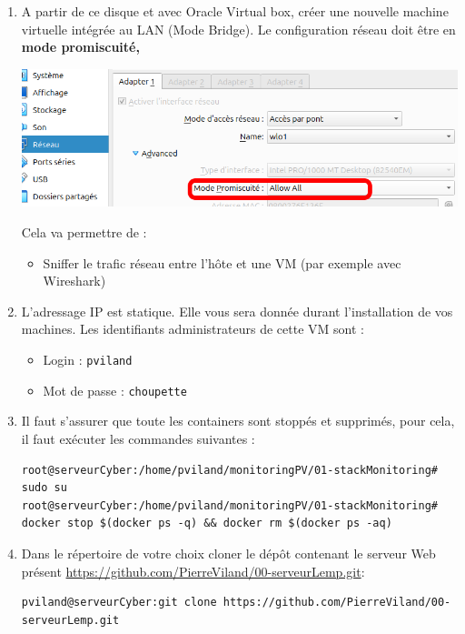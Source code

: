 \documentclass[french, 12pt]{article}%
\newcommand{\itemE}{\item[$\bullet$]}
\begin{document}
\begin{enumerate}
\item A partir de ce disque et avec Oracle Virtual box, créer une nouvelle machine virtuelle intégrée au LAN (Mode Bridge). Le configuration réseau doit être en \textbf{mode promiscuité,}

\begin{center}
\includegraphics[scale=0.4]{./ressource/modeProm.png}
\end{center}
Cela va permettre de : 
	\begin{itemize}
	\itemE Sniffer le trafic réseau entre l'hôte et une VM (par exemple avec Wireshark)
	\end{itemize}

\item L'adressage IP est statique. Elle vous sera donnée durant l'installation de vos machines. Les identifiants administrateurs de cette VM sont : 
	\begin{itemize}
	\itemE Login : \verb?pviland?
	\itemE Mot de passe : \verb?choupette?
	\end{itemize}

\item Il faut s'assurer que toute les containers sont stoppés et supprimés,  pour cela, il faut exécuter les commandes suivantes  : 
\begin{lstlisting}[style=commande]
root@serveurCyber:/home/pviland/monitoringPV/01-stackMonitoring# sudo su
root@serveurCyber:/home/pviland/monitoringPV/01-stackMonitoring# docker stop $(docker ps -q) && docker rm $(docker ps -aq)

\end{lstlisting}

\item Dans le répertoire de votre choix cloner le dépôt contenant le serveur Web présent \href{https://github.com/PierreViland/00-serveurLemp.git}{https://github.com/PierreViland/00-serveurLemp.git}: 

	\begin{lstlisting}[style=commande]
pviland@serveurCyber:git clone https://github.com/PierreViland/00-serveurLemp.git
\end{lstlisting}
	
\end{enumerate}
\end{document}
